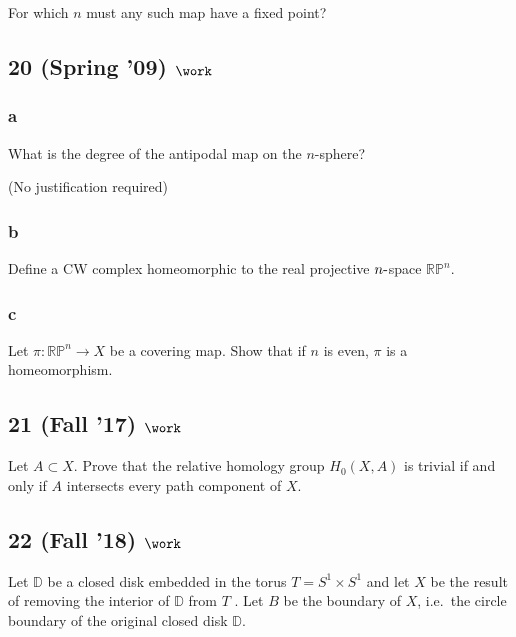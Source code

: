 For which \(n\) must any such map have a fixed point?

\hypertarget{spring-09-work-5}{%
\subsection{\texorpdfstring{20 (Spring '09)
\(\work\)}{20 (Spring '09) \textbackslash work}}\label{spring-09-work-5}}

\hypertarget{a-22}{%
\subsubsection{a}\label{a-22}}

What is the degree of the antipodal map on the \(n\)-sphere?

(No justification required)

\hypertarget{b-22}{%
\subsubsection{b}\label{b-22}}

Define a CW complex homeomorphic to the real projective
\(n{\hbox{-}}\)space \({\mathbb{RP}}^n\).

\hypertarget{c-6}{%
\subsubsection{c}\label{c-6}}

Let \(\pi : {\mathbb{RP}}^n \to X\) be a covering map. Show that if
\(n\) is even, \(\pi\) is a homeomorphism.

\hypertarget{fall-17-work-3}{%
\subsection{\texorpdfstring{21 (Fall '17)
\(\work\)}{21 (Fall '17) \textbackslash work}}\label{fall-17-work-3}}

Let \(A \subset X\). Prove that the relative homology group
\(H_0 (X, A)\) is trivial if and only if \(A\) intersects every path
component of \(X\).

\hypertarget{fall-18-work-6}{%
\subsection{\texorpdfstring{22 (Fall '18)
\(\work\)}{22 (Fall '18) \textbackslash work}}\label{fall-18-work-6}}

Let \({\mathbb{D}}\) be a closed disk embedded in the torus
\(T = S^1 \times S^1\) and let \(X\) be the result of removing the
interior of \({\mathbb{D}}\) from \(T\) . Let \(B\) be the boundary of
\(X\), i.e.~the circle boundary of the original closed disk
\({\mathbb{D}}\).

